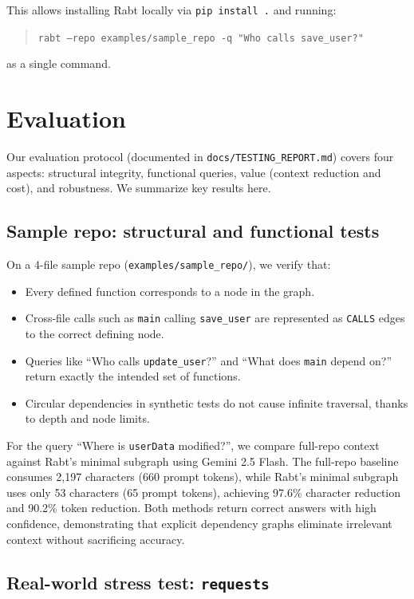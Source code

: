 \documentclass[11pt]{article}
\begin{document}
This allows installing Rabt locally via \texttt{pip install .} and running:
\begin{quote}
\texttt{rabt --repo examples/sample\_repo -q "Who calls save\_user?"}
\end{quote}
as a single command.

\section{Evaluation}

Our evaluation protocol (documented in \texttt{docs/TESTING\_REPORT.md}) covers four aspects:
structural integrity, functional queries, value (context reduction and cost), and robustness.
We summarize key results here.

\subsection{Sample repo: structural and functional tests}

On a 4-file sample repo (\texttt{examples/sample\_repo/}), we verify that:
\begin{itemize}
  \item Every defined function corresponds to a node in the graph.
  \item Cross-file calls such as \texttt{main} calling \texttt{save\_user} are represented as \texttt{CALLS} edges to the correct defining node.
  \item Queries like ``Who calls \texttt{update\_user}?'' and ``What does \texttt{main} depend on?'' return exactly the intended set of functions.
  \item Circular dependencies in synthetic tests do not cause infinite traversal, thanks to depth and node limits.
\end{itemize}

For the query ``Where is \texttt{userData} modified?'', we compare full-repo context against Rabt's minimal subgraph using Gemini 2.5 Flash.
The full-repo baseline consumes 2,197 characters (660 prompt tokens), while Rabt's minimal subgraph uses only 53 characters (65 prompt tokens), achieving 97.6\% character reduction and 90.2\% token reduction.
Both methods return correct answers with high confidence, demonstrating that explicit dependency graphs eliminate irrelevant context without sacrificing accuracy.

\subsection{Real-world stress test: \texttt{requests}}
\end{document}
